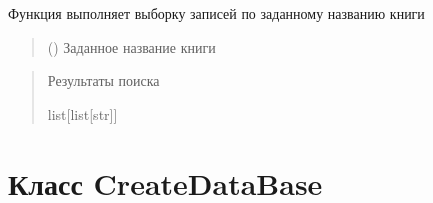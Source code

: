 \documentclass[letterpaper,10pt,russian]{sphinxmanual}
\begin{document}
\begin{fulllineitems}
\begin{fulllineitems}
\label{\detokenize{database.sqlite3_interface.views:database.sqlite3_interface.views.view_search.ViewSearch.select_on_title}}
\pysigstartsignatures
{}
\pysigstopsignatures
\sphinxAtStartPar
Функция выполняет выборку записей по заданному названию книги
\begin{quote}\begin{description}
\sphinxAtStartPar
{} () \textendash{} Заданное название книги

\end{description}\end{quote}
\begin{description}
\begin{sphinxVerbatim}[commandchars=\\\{\}]
\end{sphinxVerbatim}

\end{description}
\begin{quote}\begin{description}
\sphinxAtStartPar
Результаты поиска

\sphinxAtStartPar
list{[}list{[}str{]}{]}

\end{description}\end{quote}

\end{fulllineitems}


\end{fulllineitems}



\section{Класс CreateDataBase}
\label{\detokenize{database.sqlite3_interface:module-database.sqlite3_interface.create_db}}\label{\detokenize{database.sqlite3_interface:createdatabase}}
\end{document}
